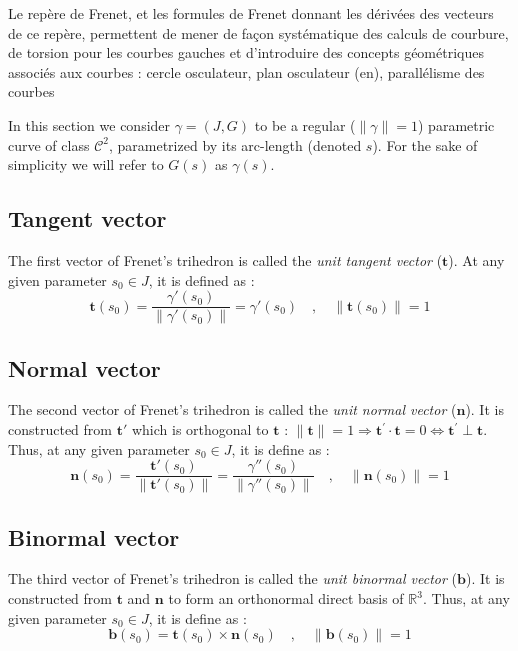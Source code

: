 Le repère de Frenet, et les formules de Frenet donnant les dérivées des vecteurs de ce repère, permettent de mener de façon systématique des calculs de courbure, de torsion pour les courbes gauches et d'introduire des concepts géométriques associés aux courbes : cercle osculateur, plan osculateur (en), parallélisme des courbes

In this section we consider $\gamma=(J,G)$ to be a regular ($\|\gamma\|=1$) parametric curve of class ${\mathcal{C}}^{2}$, parametrized by its arc-length (denoted $s$). For the sake of simplicity we will refer to $G(s)$ as $\gamma(s)$.

\subsection{Tangent vector}
The first vector of Frenet's trihedron is called the \emph{unit tangent vector} ($\mathbf{t}$). At any given parameter $s_0 \in J$,  it is defined as :
\begin{equation}
\mathbf{t}(s_0) = \frac{\gamma'(s_0)}{\|\gamma'(s_0)\|} = \gamma'(s_0)
\quad,\quad
\|\mathbf{t}(s_0)\|=1
\end{equation}

\subsection{Normal vector}
The second vector of Frenet's trihedron is called the \emph{unit normal vector} ($\mathbf{n}$). It is constructed from $\mathbf{t'}$ which is orthogonal to $\mathbf{t}$ : $\|\mathbf{t}\|=1 \Rightarrow \mathbf{t^{'}} \cdot  \mathbf{t} = 0 \Leftrightarrow  \mathbf{t^{'}} \perp \mathbf{t}$. Thus, at any given parameter $s_0 \in J$, it is define as :
\begin{equation}
\mathbf{n}(s_0) = \frac{\mathbf{t}'(s_0)}{\|\mathbf{t}'(s_0)\|} = \frac{\gamma''(s_0)}{\|\gamma''(s_0)\|}
\quad,\quad
\|\mathbf{n}(s_0)\|=1
\end{equation}

\subsection{Binormal vector}
The third vector of Frenet's trihedron is called the \emph{unit binormal vector} ($\mathbf{b}$). It is constructed from $\mathbf{t}$ and $\mathbf{n}$ to form an orthonormal direct basis of $\mathbb{R}^{3}$. Thus, at any given parameter $s_0 \in J$, it is define as :
\begin{equation}
\mathbf{b}(s_0) = \mathbf{t}(s_0) \times \mathbf{n}(s_0) 
\quad,\quad
\|\mathbf{b}(s_0)\|=1
\end{equation}


